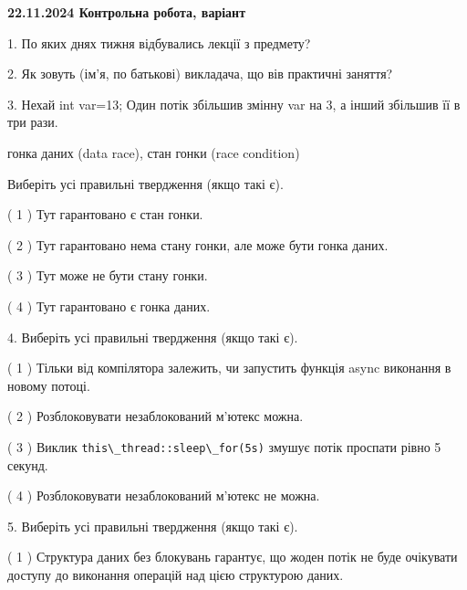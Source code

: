 \documentclass[12pt, ukrainian]{article}
\def\code#1{\Verb!#1!}
\begin{document}
\vspace{4mm}
\newpage
\begin {large}

\textbf{22.11.2024 Контрольна робота, варіант  }\par


{
1. По яких днях тижня відбувались лекції з предмету?



\vspace{5mm}
2. Як зовуть (ім'я, по батькові) викладача, що вів практичні заняття?



\vspace{5mm}
3. Нехай int var=13; Один потік збільшив змінну var на 3, а інший збільшив її в три рази.

гонка даних (data race), стан гонки (race condition)

Виберіть усі правильні твердження (якщо такі є).\par
\vspace{2mm}
( 1 ) Тут гарантовано є стан гонки.%

( 2 ) Тут гарантовано нема стану гонки, але може бути гонка даних.%

( 3 ) Тут може не бути стану гонки.%

( 4 ) Тут гарантовано є гонка даних.%


\vspace{5mm}
4. Виберіть усі правильні твердження (якщо такі є).\par
\vspace{2mm}

( 1 ) Тільки від компілятора залежить, чи запустить функція async виконання в новому потоці.%

( 2 ) Розблоковувати незаблокований м’ютекс можна.%

( 3 ) Виклик \code{this\_thread::sleep\_for(5s)} змушує потік проспати рівно 5 секунд.%

( 4 ) Розблоковувати незаблокований м’ютекс не можна.%


\vspace{5mm}
5. Виберіть усі правильні твердження (якщо такі є).\par
\vspace{2mm}

( 1 ) Структура даних без блокувань гарантує, що жоден потік не буде очікувати доступу до виконання операцій над цією структурою даних.%

}
\end{large}
\end{document}
